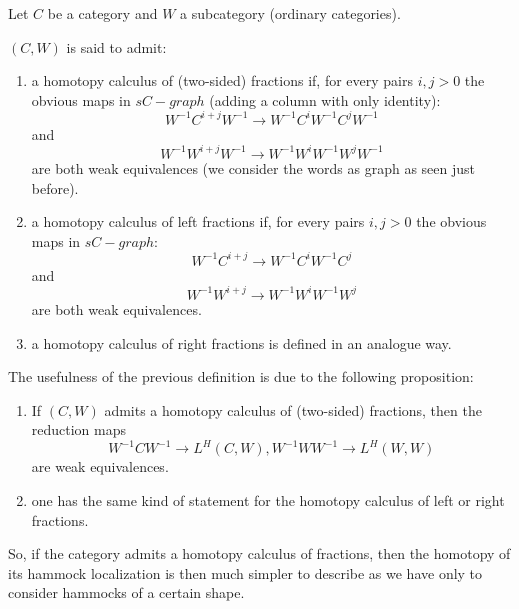 Let $C$ be a category and $W$ a subcategory (ordinary categories).

\begin{defin}
$(C,W)$ is said to admit:
\begin{enumerate}
\item a homotopy calculus of (two-sided) fractions if, for every pairs $i,j >0$ the obvious maps in $sC-graph$ (adding a column with only identity):
\begin{equation}
W^{-1}C^{i+j}W^{-1} \rightarrow W^{-1}C^iW^{-1}C^jW^{-1}
\end{equation}
and
\begin{equation}
W^{-1}W^{i+j}W^{-1} \rightarrow W^{-1}W^i W^{-1} W^j W^{-1}
\end{equation}
are both weak equivalences (we consider the words as graph as seen just before).
\item a homotopy calculus of left fractions if, for every pairs $i,j >0$ the obvious maps in $sC-graph$:
\begin{equation}
W^{-1}C^{i+j} \rightarrow W^{-1}C^iW^{-1}C^j
\end{equation}
and
\begin{equation}
W^{-1}W^{i+j} \rightarrow W^{-1}W^i W^{-1} W^j
\end{equation}
are both weak equivalences.
\item a homotopy calculus of right fractions is defined in an analogue way.
\end{enumerate}
\end{defin}

The usefulness of the previous definition is due to the following proposition:

\begin{prop}
\begin{enumerate}
\item If $(C,W)$ admits a homotopy calculus of (two-sided) fractions, then the reduction maps
\begin{equation}
W^{-1}CW^{-1} \rightarrow L^H (C,W), W^{-1}WW^{-1} \rightarrow L^H (W,W)
\end{equation}
are weak equivalences.
\item one has the same kind of statement for the homotopy calculus of left or right fractions.
\end{enumerate}
\end{prop}

So, if the category admits a homotopy calculus of fractions, then the homotopy of its hammock localization is then much simpler to describe as we have only to consider hammocks of a certain shape.

